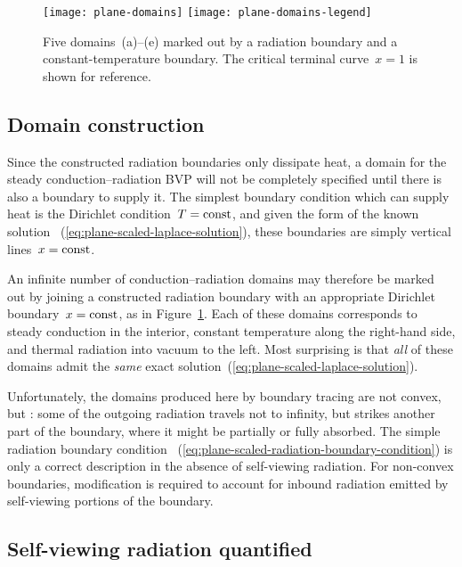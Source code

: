 \begin{figure}
  \centering
  \texttt{[image: plane-domains]}
  \texttt{[image: plane-domains-legend]}
  \caption{
    Five domains~(a)--(e) marked out by a radiation boundary
    and a constant-temperature boundary.
    The critical terminal curve~$x = 1$ is shown for reference.
  }
  \label{fig:plane-domains}
\end{figure}

\subsection{Domain construction}
\label{sec:cartesian.plane.domain}

Since the constructed radiation boundaries only dissipate heat,
a domain for the steady conduction--radiation BVP
will not be completely specified
until there is also a boundary to supply it.
The simplest boundary condition which can supply heat
is the Dirichlet condition~$T = \mathrm{const}$,
and given the form of the known solution~%
  (\ref{eq:plane-scaled-laplace-solution}),
these boundaries are simply vertical lines~$x = \mathrm{const}$.

An infinite number of conduction--radiation domains
may therefore be marked out
by joining a constructed radiation boundary
with an appropriate Dirichlet boundary~$x = \mathrm{const}$,
as in Figure~\ref{fig:plane-domains}.
Each of these domains corresponds to steady conduction in the interior,
constant temperature along the right-hand side,
and thermal radiation into vacuum to the left.
Most surprising is that \emph{all} of these domains
admit the \emph{same} exact solution~(\ref{eq:plane-scaled-laplace-solution}).

Unfortunately,
the domains produced here by boundary tracing are not convex,
but :
some of the outgoing radiation travels not to infinity,
but strikes another part of the boundary,
where it might be partially or fully absorbed.
The simple radiation boundary condition~%
  (\ref{eq:plane-scaled-radiation-boundary-condition})
is only a correct description in the absence of self-viewing radiation.
For non-convex boundaries,
modification is required to account for inbound radiation
emitted by self-viewing portions of the boundary.

\subsection{Self-viewing radiation quantified}
\label{sec:cartesian.plane.self-viewing}

